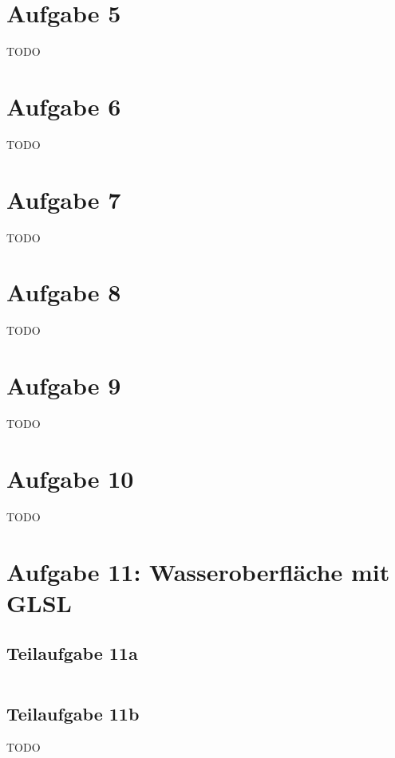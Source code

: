 \documentclass[a4paper]{scrartcl}
\begin{document}
\section*{Aufgabe 5}
TODO

\section*{Aufgabe 6}
TODO

\section*{Aufgabe 7}
TODO

\section*{Aufgabe 8}
TODO

\section*{Aufgabe 9}
TODO

\section*{Aufgabe 10}
TODO

\section*{Aufgabe 11: Wasseroberfläche mit GLSL}
\subsection*{Teilaufgabe 11a}
\inputminted[linenos, numbersep=5pt, tabsize=4, frame=lines, label=shader.frag]{glsl}{shader.frag}

\subsection*{Teilaufgabe 11b}
TODO
\end{document}
